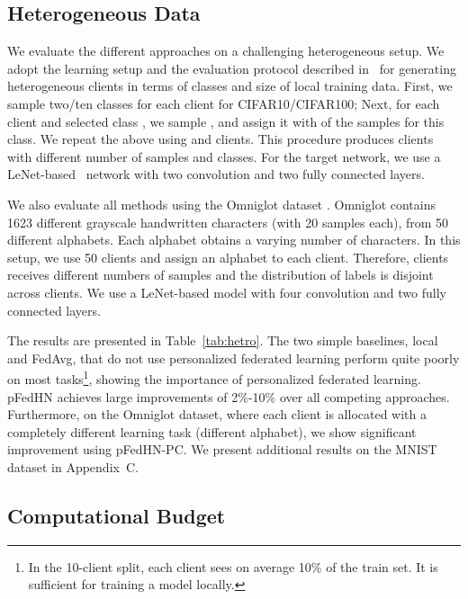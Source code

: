 \documentclass{article}
\newcommand\ourmethod{pFedHN}
\begin{document}
\subsection{Heterogeneous Data}\label{sec:hetro}



We evaluate the different approaches on a challenging heterogeneous setup. We adopt the learning setup and the evaluation protocol described  in~\citet{Dinh2020PersonalizedFL} for generating heterogeneous clients in terms of classes and size of local training data.  First, we sample two/ten classes for each client for CIFAR10/CIFAR100; Next, for each client  and selected class , we sample , and assign it with  of the samples for this class. We repeat the above using  and  clients. This procedure produces clients with different number of samples and classes.
For the target network, we use a LeNet-based~\cite{lecun1998gradient} network with two convolution and two fully connected layers.


We also evaluate all methods using the Omniglot dataset \cite{lake2015human}.
Omniglot contains 1623 different grayscale handwritten characters (with 20 samples each), from 50 different alphabets. Each alphabet obtains a varying number of characters. In this setup, we use 50 clients and assign an alphabet to each client. Therefore, clients receives  different numbers of samples and the distribution of labels is disjoint across clients. We use a LeNet-based model with four convolution and two fully connected layers.

The results are presented in Table~\ref{tab:hetro}. 
The two simple baselines, local and FedAvg, that do not use personalized federated learning perform quite poorly on most tasks\footnote{In the 10-client split, each client sees on average 10\% of the train set. It is sufficient for training a model locally.}, showing the importance of personalized federated learning. \ourmethod{} achieves large improvements of 2\%-10\% over all competing approaches. Furthermore, on the Omniglot dataset, where each client is allocated with a completely different learning task (different alphabet), we show significant improvement using \ourmethod{}-PC. We present additional results on the MNIST dataset in Appendix~C.

\subsection{Computational Budget}\label{sec:comp}
\end{document}
